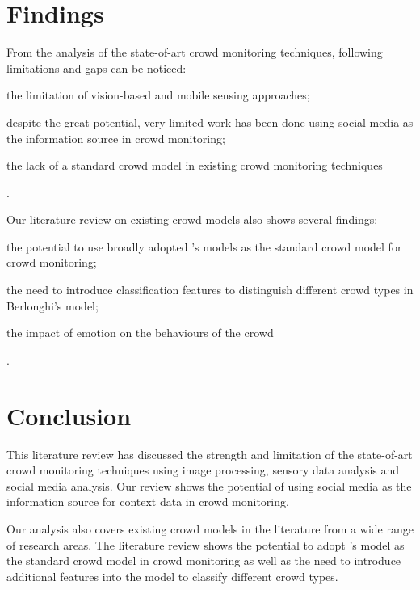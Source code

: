 \section{Findings}
From the analysis of the state-of-art crowd monitoring techniques, following limitations and gaps can be noticed:
\begin{inparaenum}[i)]
	\item the limitation of vision-based and mobile sensing approaches;
	\item despite the great potential, very limited work has been done using social media as the information source in crowd monitoring;
	\item the lack of a standard crowd model in existing crowd monitoring techniques
\end{inparaenum}.

Our literature review on existing crowd models also shows several findings:
\begin{inparaenum}[i)]
	\item the potential to use broadly adopted \citet{Berlonghi1995}'s models as the standard crowd model for crowd monitoring;
	\item the need to introduce classification features to distinguish different crowd types in Berlonghi's model;
	\item the impact of emotion on the behaviours of the crowd
\end{inparaenum}.

\section{Conclusion}
This literature review has discussed the strength and limitation of the state-of-art crowd monitoring techniques using image processing, sensory data analysis and social media analysis. Our review shows the potential of using social media as the information source for context data in crowd monitoring.

Our analysis also covers existing crowd models in the literature from a wide range of research areas. The literature review shows the potential to adopt \citet{Berlonghi1995}'s model as the standard crowd model in crowd monitoring as well as the need to introduce additional features into the model to classify different crowd types.